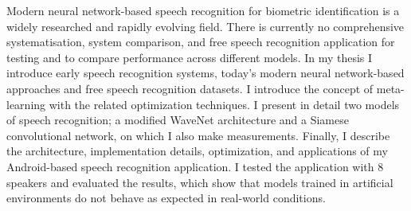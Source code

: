 Modern neural network-based speech recognition for biometric identification is a widely researched and rapidly evolving field. There is currently no comprehensive systematisation, system comparison, and free speech recognition application for testing and to compare performance across different models.
\newline
\newline
In my thesis I introduce early speech recognition systems, today's modern neural network-based approaches and free speech recognition datasets. I introduce the concept of meta-learning with the related optimization techniques. I present in detail two models of speech recognition; a modified WaveNet architecture and a Siamese convolutional network, on which I also make measurements.
\newline
\newline
Finally, I describe the architecture, implementation details, optimization, and applications of my Android-based speech recognition application.
I tested the application with 8 speakers and evaluated the results, which show that models trained in artificial environments do not behave as expected in real-world conditions.


\vfill
\selectthesislanguage

\setcounter{romanPage}{\value{page}}
